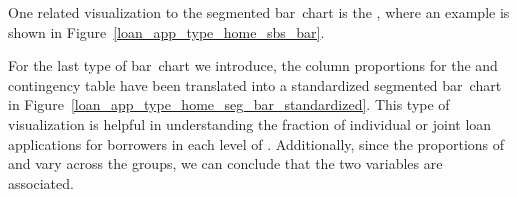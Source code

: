 One related visualization to the segmented bar~chart is the
,
where an example is shown in
Figure~\ref{loan_app_type_home_sbs_bar}.

For the last type of bar~chart we introduce,
the column proportions for the
 and  contingency table
have been translated into a standardized segmented bar~chart
in Figure~\ref{loan_app_type_home_seg_bar_standardized}.
This type of visualization is helpful in understanding
the fraction of individual or joint loan applications
for borrowers in each level of .
Additionally, since the proportions of 
and  vary across the groups,
we can conclude that the two variables are associated.

\newcommand{\loanapptypehomesegbarplotwidth}{0.46\textwidth}
